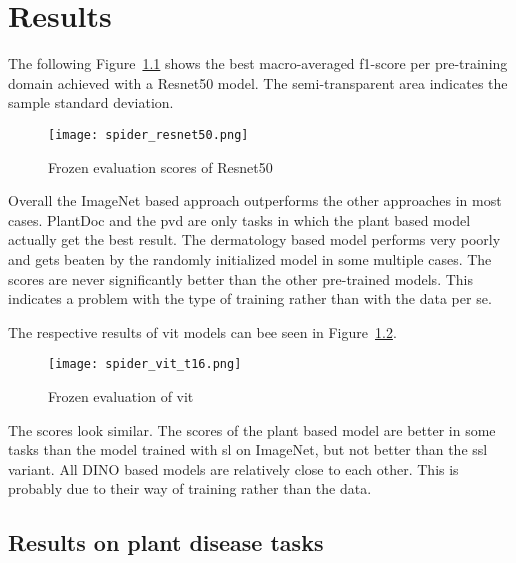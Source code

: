 \chapter{Results}\label{chapter_4}

The following Figure~\ref{fig:spider_resnet50} shows the best macro-averaged f1-score per pre-training domain achieved with a Resnet50 model. 
The semi-transparent area indicates the sample standard deviation.

\begin{figure}[H]
    \begin{center}
    \texttt{[image: spider\_resnet50.png]}
    \caption{Frozen evaluation scores of Resnet50}\label{fig:spider_resnet50}
    \end{center}
\end{figure}

Overall the ImageNet based approach outperforms the other approaches in most cases.
PlantDoc and the \gls{pvd} are only tasks in which the plant based model actually get the best result.
The dermatology based model performs very poorly and gets beaten by the randomly initialized model in some multiple cases.
The scores are never significantly better than the other pre-trained models. 
This indicates a problem with the type of training rather than with the data per se.

The respective results of \gls{vit} models can bee seen in Figure~\ref{fig:spider_vit_t16}.

\begin{figure}[H]
    \begin{center}
    \texttt{[image: spider\_vit\_t16.png]}
    \caption{Frozen evaluation of \gls{vit}}\label{fig:spider_vit_t16}
    \end{center}
\end{figure}

The scores look similar. 
The scores of the plant based model are better in some tasks than the model trained with \gls{sl} on ImageNet, but not better than the \gls{ssl} variant. 
All DINO based models are relatively close to each other. 
This is probably due to their way of training rather than the data.

\section{Results on plant disease tasks}

